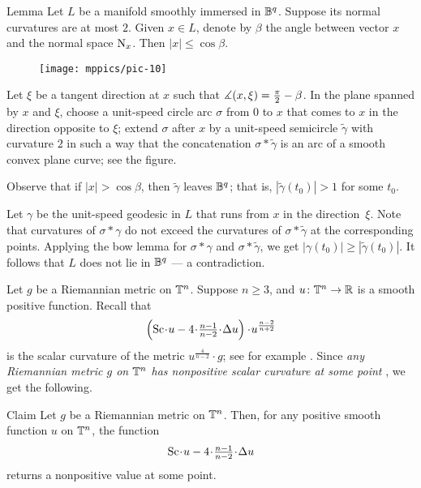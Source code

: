 \documentclass[a4paper,10pt]{article}
\begin{document}
\begin{thm}{Lemma}\label{lem:trivial}
Let $L$ be a manifold smoothly immersed in $\mathbb{B}^q$.
Suppose its normal curvatures are at most $2$.
Given $x\in L$, denote by $\beta$ the angle between vector $x$ and the normal space $\mathrm{N}_x$.
Then $|x|\le \cos\beta$.
\end{thm}

\begin{wrapfigure}{r}{39 mm}
\vskip-8mm
\centering
\texttt{[image: mppics/pic-10]}
\vskip0mm
\end{wrapfigure}

Let $\xi$ be a tangent direction at $x$ such that $\measuredangle(x,\xi)\z=\tfrac\pi2-\beta$.
In the plane spanned by $x$ and $\xi$, choose a unit-speed circle arc $\sigma$ from $0$ to $x$ that comes to $x$ in the direction opposite to $\xi$;
extend $\sigma$ after $x$ by a unit-speed semicircle $\tilde\gamma$ with curvature $2$ in such a way that the concatenation $\sigma*\tilde\gamma$ is an arc of a smooth convex plane curve; see the figure.

Observe that if $|x|> \cos\beta$, then $\tilde\gamma$ leaves $\mathbb{B}^q$; that is, $|\tilde\gamma(t_0)|>1$ for some $t_0$.

Let $\gamma$ be the unit-speed geodesic in $L$ that runs from $x$ in the direction~$\xi$.
Note that curvatures of $\sigma*\gamma$ do not exceed the curvatures of $\sigma*\tilde\gamma$ at the corresponding points.
Applying the bow lemma for $\sigma*\gamma$ and $\sigma*\tilde\gamma$, we get $|\gamma(t_0)|\ge |\tilde\gamma(t_0)|$.
It follows that $L$ does not lie in $\mathbb{B}^q$ --- a contradiction.
\qeds

Let $g$ be a Riemannian metric on $\mathbb{T}^n$.
Suppose $n\ge 3$, and $u\colon\mathbb{T}^n\to \mathbb{R}$ is a smooth positive function.
Recall that
\[\left(\Sc\cdot u-4{\cdot}\tfrac{n-1}{n-2}{\cdot}\Delta u\right)\cdot u^{\frac{n-2}{n+2}}\]
is the scalar curvature of the metric $u^{\frac{4}{n-2}}\cdot g$;
see for example \cite[6.3]{aubin}.
Since \emph{any Riemannian metric $g$ on $\mathbb{T}^n$ has nonpositive scalar curvature at some point} \cite[Corollary A]{gromov-lawson}, we get the following.

\begin{thm}{Claim}\label{clm:sc-lap}
Let $g$ be a Riemannian metric on $\mathbb{T}^n$.
Then, for any positive smooth function $u$ on $\mathbb{T}^n$, the function 
\[\Sc\cdot u-4{\cdot}\tfrac{n-1}{n-2}{\cdot}\Delta u\]
returns a nonpositive value at some point.
\end{thm}
\end{document}
